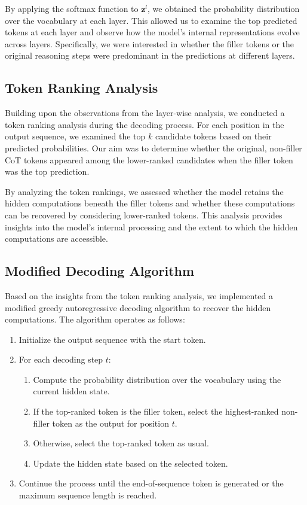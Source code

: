 \documentclass{article}
\begin{document}
By applying the softmax function to $\mathbf{z}^l$, we obtained the probability distribution over the vocabulary at each layer. This allowed us to examine the top predicted tokens at each layer and observe how the model's internal representations evolve across layers. Specifically, we were interested in whether the filler tokens or the original reasoning steps were predominant in the predictions at different layers.

\subsection{Token Ranking Analysis}

Building upon the observations from the layer-wise analysis, we conducted a token ranking analysis during the decoding process. For each position in the output sequence, we examined the top $k$ candidate tokens based on their predicted probabilities. Our aim was to determine whether the original, non-filler CoT tokens appeared among the lower-ranked candidates when the filler token was the top prediction.

By analyzing the token rankings, we assessed whether the model retains the hidden computations beneath the filler tokens and whether these computations can be recovered by considering lower-ranked tokens. This analysis provides insights into the model's internal processing and the extent to which the hidden computations are accessible.

\subsection{Modified Decoding Algorithm}
\label{ssec:Filler tokens}

Based on the insights from the token ranking analysis, we implemented a modified greedy autoregressive decoding algorithm to recover the hidden computations. The algorithm operates as follows:

\begin{enumerate}
    \item Initialize the output sequence with the start token.
    \item For each decoding step $t$:
    \begin{enumerate}
        \item Compute the probability distribution over the vocabulary using the current hidden state.
        \item If the top-ranked token is the filler token, select the highest-ranked non-filler token as the output for position $t$.
        \item Otherwise, select the top-ranked token as usual.
        \item Update the hidden state based on the selected token.
    \end{enumerate}
    \item Continue the process until the end-of-sequence token is generated or the maximum sequence length is reached.
\end{enumerate}
\end{document}
